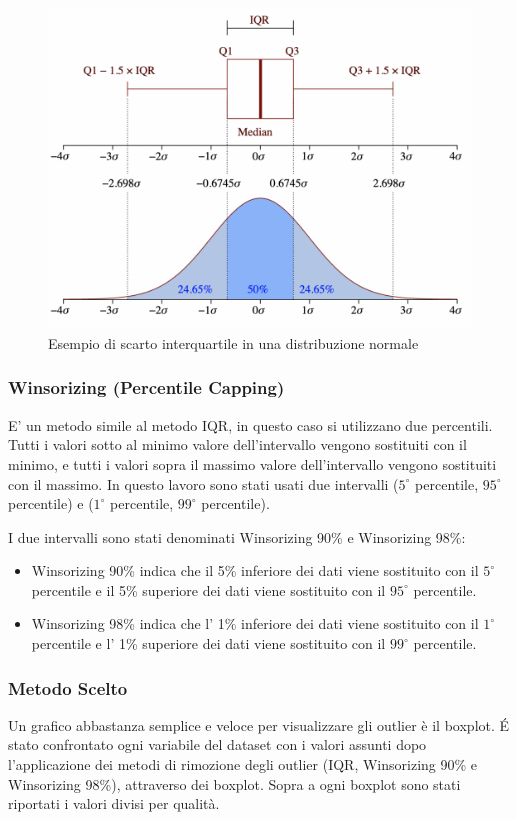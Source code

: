 \begin{figure}
    \centering
    \includegraphics[width=.8\textwidth]{images/IQR.png}
    \caption{Esempio di scarto interquartile in una distribuzione normale \cite{wikipedia:iqr}}
    \label{fig:iqr}
\end{figure}

\subsubsection{Winsorizing (Percentile Capping)}
E' un metodo simile al metodo IQR, in questo caso si utilizzano due percentili. Tutti i valori sotto al minimo valore dell'intervallo vengono sostituiti con il minimo, e tutti i valori sopra il massimo valore dell'intervallo vengono sostituiti con il massimo. In questo lavoro sono stati usati due intervalli ($5^{\circ}$ percentile, $95^{\circ}$ percentile) e ($1^{\circ}$ percentile, $99^{\circ}$ percentile).

\noindent
I due intervalli sono stati denominati Winsorizing 90\% e Winsorizing 98\%:
\begin{itemize}
    \item Winsorizing 90\% indica che il 5\% inferiore dei dati viene sostituito con il $5^{\circ}$ percentile e il 5\% superiore dei dati viene sostituito con il $95^{\circ}$ percentile.
    \item Winsorizing 98\% indica che l' 1\% inferiore dei dati viene sostituito con il $1^{\circ}$ percentile e l' 1\% superiore dei dati viene sostituito con il $99^{\circ}$ percentile.
\end{itemize}

\subsubsection{Metodo Scelto}
Un grafico abbastanza semplice e veloce per visualizzare gli outlier è il boxplot. \'{E} stato confrontato ogni variabile del dataset con i valori assunti dopo l'applicazione dei metodi di rimozione degli outlier (IQR, Winsorizing 90\% e Winsorizing 98\%), attraverso dei boxplot. Sopra a ogni boxplot sono stati riportati i valori divisi per qualità.

